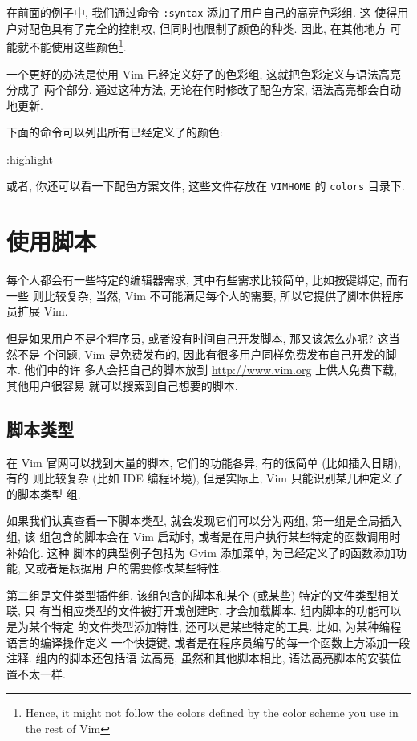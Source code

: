 在前面的例子中, 我们通过命令 \texttt{:syntax} 添加了用户自己的高亮色彩组. 这
使得用户对配色具有了完全的控制权, 但同时也限制了颜色的种类. 因此, 在其他地方
可能就不能使用这些颜色\footnote{Hence, it might not follow the colors defined
by the color scheme you use in the rest of Vim}.

一个更好的办法是使用 Vim 已经定义好了的色彩组, 这就把色彩定义与语法高亮分成了
两个部分. 通过这种方法, 无论在何时修改了配色方案, 语法高亮都会自动地更新.

下面的命令可以列出所有已经定义了的颜色:
\begin{vimcode}
:highlight
\end{vimcode}

\begin{warning}
    或者, 你还可以看一下配色方案文件, 这些文件存放在 \texttt{VIMHOME} 的
    \texttt{colors} 目录下.
\end{warning}

\section{使用脚本}
\label{sec:using_scripts}

每个人都会有一些特定的编辑器需求, 其中有些需求比较简单, 比如按键绑定, 而有一些
则比较复杂, 当然, Vim 不可能满足每个人的需要, 所以它提供了脚本供程序员扩展
Vim.

但是如果用户不是个程序员, 或者没有时间自己开发脚本, 那又该怎么办呢? 这当然不是
个问题, Vim 是免费发布的, 因此有很多用户同样免费发布自己开发的脚本. 他们中的许
多人会把自己的脚本放到 \url{http://www.vim.org} 上供人免费下载, 其他用户很容易
就可以搜索到自己想要的脚本.

\subsection{脚本类型}
\label{subsec:script_types}

在 Vim 官网可以找到大量的脚本, 它们的功能各异, 有的很简单 (比如插入日期), 有的
则比较复杂 (比如 IDE 编程环境), 但是实际上, Vim 只能识别某几种定义了的脚本类型
组.

如果我们认真查看一下脚本类型, 就会发现它们可以分为两组, 第一组是全局插入组, 该
组包含的脚本会在 Vim 启动时, 或者是在用户执行某些特定的函数调用时补始化. 这种
脚本的典型例子包括为 Gvim 添加菜单, 为已经定义了的函数添加功能, 又或者是根据用
户的需要修改某些特性.

第二组是文件类型插件组. 该组包含的脚本和某个 (或某些) 特定的文件类型相关联, 只
有当相应类型的文件被打开或创建时, 才会加载脚本. 组内脚本的功能可以是为某个特定
的文件类型添加特性, 还可以是某些特定的工具. 比如, 为某种编程语言的编译操作定义
一个快捷键, 或者是在程序员编写的每一个函数上方添加一段注释. 组内的脚本还包括语
法高亮, 虽然和其他脚本相比, 语法高亮脚本的安装位置不太一样.

